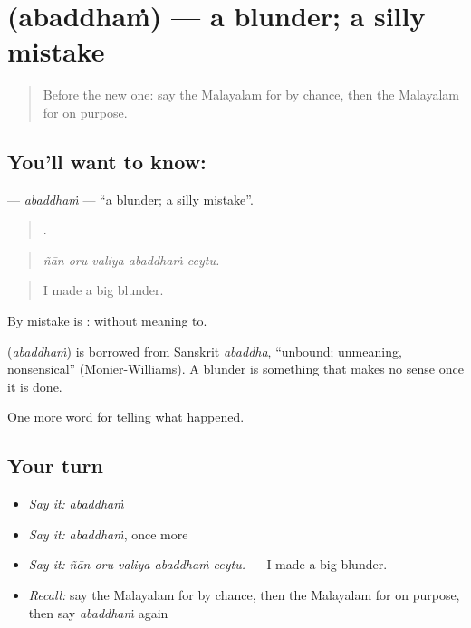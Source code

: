 \section[\texorpdfstring{\ml{അബദ്ധം} (abaddhaṁ)}{അബദ്ധം (abaddhaṁ)}]{ (abaddhaṁ) — a blunder; a silly mistake}

\label{lesson:ML-C360-abaddham}



\begin{quote}
Before the new one: say the Malayalam for by chance, then the Malayalam for on purpose.
\end{quote}

\subsection*{You'll want to know: }
\textbf{} — \emph{abaddhaṁ} — \textquotedblleft{}a blunder; a silly mistake\textquotedblright{}.

\begin{quote}
    .
\end{quote}

\begin{quote}
\emph{ñān oru valiya abaddhaṁ ceytu.}
\end{quote}

\begin{quote}
I made a big blunder.
\end{quote}

By mistake is : without meaning to.

\begin{cousinweb}
\textbf{} (\emph{abaddhaṁ}) is borrowed from Sanskrit \emph{abaddha}, \textquotedblleft{}unbound; unmeaning, nonsensical\textquotedblright{} (Monier-Williams). A blunder is something that makes no sense once it is done.
\end{cousinweb}

\begin{grammarlens}[title={What you've built}]
One more word for telling what happened.
\end{grammarlens}

\subsection*{Your turn}
\begin{itemize}
\raggedright
  \item \emph{Say it:} \emph{abaddhaṁ}
  \item \emph{Say it:} \emph{abaddhaṁ}, once more
  \item \emph{Say it:} \emph{ñān oru valiya abaddhaṁ ceytu.} — I made a big blunder.
  \item \emph{Recall:} say the Malayalam for by chance, then the Malayalam for on purpose, then say \emph{abaddhaṁ} again
\end{itemize}

